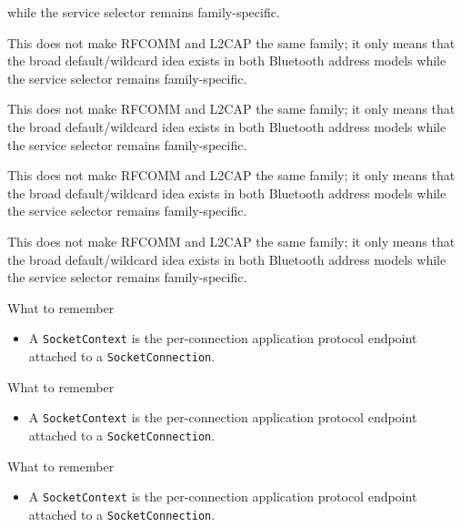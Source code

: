 \documentclass[
  a4paper,
  openany]{book}
\providecommand{\tightlist}{%
  \setlength{\itemsep}{0pt}\setlength{\parskip}{0pt}}
\providecommand{\passthrough}[1]{#1}
\begin{document}
while the service selector remains family-specific.\par
\clearpage
{}
This does not make RFCOMM and L2CAP the same family; it only means that
the broad default/wildcard idea exists in both Bluetooth address models
while the service selector remains family-specific.\par
\clearpage
{}
This does not make RFCOMM and L2CAP the same family; it only means that
the broad default/wildcard idea exists in both Bluetooth address models
while the service selector remains family-specific.\par
\clearpage
{}
\begingroup\raggedright This does not make RFCOMM and L2CAP the same family; it only means that
the broad default/wildcard idea exists in both Bluetooth address models
while the service selector remains family-specific.\par\endgroup
\clearpage
{}
This does not make RFCOMM and L2CAP the same family; it only means that
the broad default/\allowbreak{}wildcard idea exists in both Bluetooth address models
while the service selector remains family-specific.\par
\clearpage
{}
\begin{snodecrememberbox}{What to remember}\begin{itemize}\tightlist\item A \passthrough{\lstinline!SocketContext!} is the per-connection
  application protocol endpoint attached to a
  \passthrough{\lstinline!SocketConnection!}.\par\end{itemize}\end{snodecrememberbox}
\clearpage
{}
\begin{snodecrememberbox}{What to remember}\begin{itemize}\tightlist\item A \passthrough{\lstinline!SocketContext!} is the per-connection
  application protocol endpoint attached to a
  \passthrough{\lstinline!SocketConnection!}.\par\end{itemize}\end{snodecrememberbox}
\clearpage
{}
\begin{snodecrememberbox}{What to remember}\begin{itemize}\tightlist\item A \passthrough{\lstinline!SocketContext!} is the per-connection
  application protocol endpoint attached to a
  \passthrough{\lstinline!SocketConnection!}.\par\end{itemize}\end{snodecrememberbox}
\end{document}
